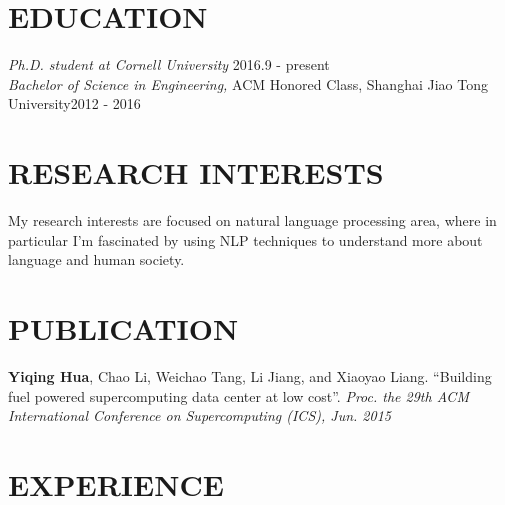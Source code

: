 \documentclass[margin, 10pt]{res} %
\begin{document}
\begin{resume}



\section{EDUCATION}

{\sl Ph.D. student at Cornell University} \hfill 2016.9 - present \\
{\sl Bachelor of Science in Engineering,} ACM Honored Class, Shanghai Jiao Tong University\hfill 2012 - 2016\\

\section{RESEARCH INTERESTS}
My research interests are focused on natural language processing area, where in particular I'm fascinated by using NLP techniques to understand more about language and human society. 


\section{PUBLICATION}
\textbf{Yiqing Hua}, Chao Li, Weichao Tang, Li Jiang, and Xiaoyao Liang. 
“Building fuel powered supercomputing data center at low cost”.
\textit{Proc. the 29th ACM International Conference on Supercomputing (ICS), Jun. 2015}


 
\section{EXPERIENCE}


\end{resume}
\end{document}
